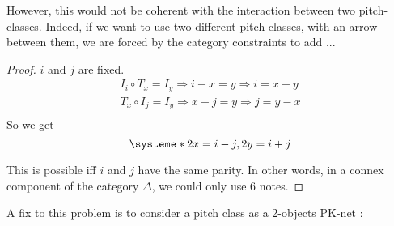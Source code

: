 \documentclass{report}
\begin{document}
However, this would not be coherent with the interaction between two pitch-classes. Indeed, if we want to use two different pitch-classes, with an arrow between them, we are forced by the category constraints to add ...


\begin{figure}[ht]
    \centering
\end{figure}

\begin{proof}
    $i$ and $j$ are fixed.
    \begin{eqnarray*}
        I_i \circ T_x  = I_y \Rightarrow i - x = y \Rightarrow i = x + y\\
        T_x \circ I_j = I_y \Rightarrow x + j = y \Rightarrow j = y - x\\
    \end{eqnarray*}
    So we get
    $$\systeme*{2x = i - j, 2y = i + j}$$

    This is possible iff $i$ and $j$ have the same parity. In other words, in a connex component of the category $\Delta$, we could only use 6 notes.


\end{proof}

A fix to this problem is to consider a pitch class as a 2-objects PK-net :
\end{document}

